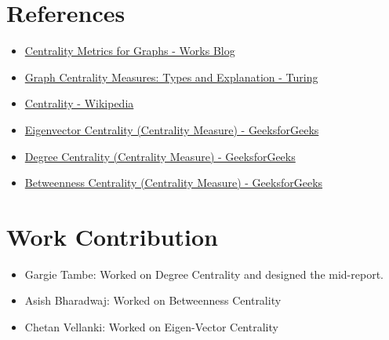 \documentclass{article}
\begin{document}
\section*{References}

\begin{itemize}
    \item \href{https://www.works.so/blog/developers/centrality-metrics-for-graphs}{Centrality Metrics for Graphs - Works Blog}
    \item \href{https://www.turing.com/kb/graph-centrality-measures}{Graph Centrality Measures: Types and Explanation - Turing}
    \item \href{https://en.wikipedia.org/wiki/Centrality}{Centrality - Wikipedia}
    \item \href{https://www.geeksforgeeks.org/eigenvector-centrality-centrality-measure/}{Eigenvector Centrality (Centrality Measure) - GeeksforGeeks}
    \item \href{https://www.geeksforgeeks.org/degree-centrality-centrality-measure/}{Degree Centrality (Centrality Measure) - GeeksforGeeks}
    \item \href{https://www.geeksforgeeks.org/betweenness-centrality-centrality-measure/}{Betweenness Centrality (Centrality Measure) - GeeksforGeeks}
\end{itemize}

\section*{Work Contribution}

\begin{itemize}
    \item Gargie Tambe: Worked on Degree Centrality and designed the mid-report. 
    \item Asish Bharadwaj: Worked on Betweenness Centrality
    \item Chetan Vellanki: Worked on Eigen-Vector Centrality
\end{itemize}
\end{document}
